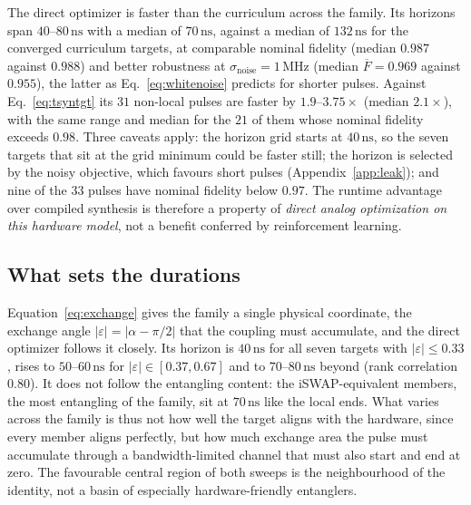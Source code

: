 \documentclass[aps,prx,twocolumn,superscriptaddress,nofootinbib,amsmath,amssymb,floatfix]{revtex4-2}
\newcommand{\Fbar}{\overline{F}}
\newcommand{\snoise}{\sigma_{\mathrm{noise}}}
\newcommand{\ns}{\,\mathrm{ns}}
\newcommand{\MHz}{\,\mathrm{MHz}}
\begin{document}
The direct optimizer is faster than the curriculum across the family. Its horizons span $40$--$80\ns$
with a median of $70\ns$, against a median of $132\ns$ for the converged curriculum targets, at comparable
nominal fidelity (median $0.987$ against $0.988$) and better robustness at $\snoise=1\MHz$ (median
$\Fbar=0.969$ against $0.955$), the latter as Eq.~\eqref{eq:whitenoise} predicts for shorter pulses.
Against Eq.~\eqref{eq:tsyntgt} its $31$ non-local pulses are faster by $1.9$--$3.75\times$ (median
$2.1\times$), with the same range and median for the $21$ of them whose nominal fidelity exceeds $0.98$.
Three caveats apply: the horizon grid starts at $40\ns$, so the seven targets that sit at the grid minimum
could be faster still; the horizon is selected by the noisy objective, which favours short pulses
(Appendix~\ref{app:leak}); and nine of the $33$ pulses have nominal fidelity below $0.97$. The runtime
advantage over compiled synthesis is therefore a property of \emph{direct analog optimization on this
hardware model}, not a benefit conferred by reinforcement learning.

\subsection{What sets the durations}
\label{sec:physicalinterp}

Equation~\eqref{eq:exchange} gives the family a single physical coordinate, the exchange angle
$|\varepsilon|=|\alpha-\pi/2|$ that the coupling must accumulate, and the direct optimizer follows it
closely. Its horizon is $40\ns$ for all seven targets with $|\varepsilon|\le0.33$, rises to $50$--$60\ns$
for $|\varepsilon|\in[0.37,0.67]$ and to $70$--$80\ns$ beyond (rank correlation $0.80$). It does not
follow the entangling content: the iSWAP-equivalent members, the most entangling of the family, sit at
$70\ns$ like the local ends. What varies across the family is thus not how well the target aligns with the
hardware, since every member aligns perfectly, but how much exchange area the pulse must accumulate
through a bandwidth-limited channel that must also start and end at zero. The favourable central region of
both sweeps is the neighbourhood of the identity, not a basin of especially hardware-friendly entanglers.
\end{document}
